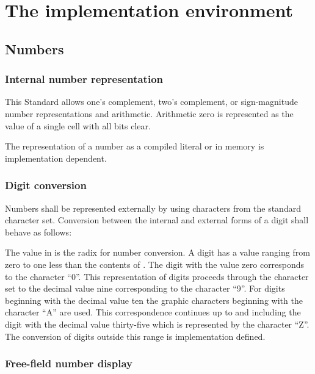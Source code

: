 \section{The implementation environment} %

\subsection{Numbers} %

\subsubsection{Internal number representation} %
\label{usage:number}

This Standard allows one's complement, two's complement, or
sign-magnitude number representations and arithmetic. Arithmetic
zero is represented as the value of a single cell with all bits
clear.

The representation of a number as a compiled literal or in memory
is implementation dependent.

\subsubsection{Digit conversion} %
\label{usage:digits}

Numbers shall be represented externally by using characters from
the standard character set. Conversion between the internal and
external forms of a digit shall behave as follows:

The value in  is the radix for number conversion. A
digit has a value ranging from zero to one less than the contents
of . The digit with the value zero corresponds to the
character ``0''. This representation of digits proceeds through
the character set to the decimal value nine corresponding to the
character ``9''. For digits beginning with the decimal value ten
the graphic characters beginning with the character ``A'' are used.
This correspondence continues up to and including the digit with
the decimal value thirty-five which is represented by the character
``Z''. The conversion of digits outside this range is implementation
defined.

\subsubsection{Free-field number display} %
\label{usage:dot}

